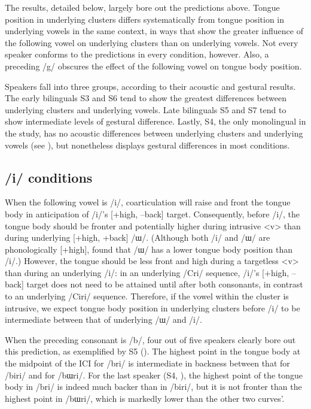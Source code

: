 \documentclass[output=paper,colorlinks,citecolor=brown]{langscibook}
\begin{document}
The results, detailed below, largely bore out the predictions above. Tongue position in underlying clusters differs systematically from tongue position in underlying vowels in the same context, in ways that show the greater influence of the following vowel on underlying clusters than on underlying vowels. Not every speaker conforms to the predictions in every condition, however. Also, a preceding /g/ obscures the effect of the following vowel on tongue body position.

Speakers fall into three groups, according to their acoustic and gestural results. The early bilinguals S3 and S6 tend to show the greatest differences between underlying clusters and underlying vowels. Late bilinguals S5 and S7 tend to show intermediate levels of gestural difference. Lastly, S4, the only monolingual in the study, has no acoustic differences between underlying clusters and underlying vowels (see \citealt{Bellik2018}), but nonetheless displays gestural differences in most conditions.


\subsection{/i/ conditions}

When the following vowel is /i/, coarticulation will raise and front the tongue body in anticipation of /i/’s [+high, –back] target. Consequently, before /i/, the tongue body should be fronter and potentially higher during intrusive <v> than during underlying [+high, +back] /ɯ/. (Although both /i/ and /ɯ/ are phonologically [+high], \citet{Kilic2004} found that /ɯ/ has a lower tongue body position than /i/.) However, the tongue should be less front and high during a targetless <v> than during an underlying /i/: in an underlying /Cri/ sequence, /i/’s [+high, –back] target does not need to be attained until after both consonants, in contrast to an underlying /Ciri/ sequence. Therefore, if the vowel within the cluster is intrusive, we expect tongue body position in underlying clusters before /i/ to be intermediate between that of underlying /ɯ/ and /i/.

When the preceding consonant is /b/, four out of five speakers clearly bore out this prediction, as exemplified by S5 (). The highest point in the tongue body at the midpoint of the ICI for /bri/ is intermediate in backness between that for /biri/ and for /bɯri/. For the last speaker (S4, ), the highest point of the tongue body in /bri/ is indeed much backer than in /biri/, but it is not fronter than the highest point in /bɯri/, which is markedly lower than the other two curves'.
\end{document}
